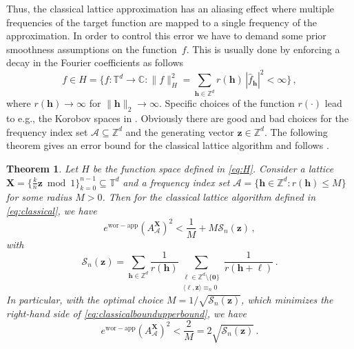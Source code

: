 \documentclass[a4paper]{amsart}
\newtheorem{theorem}{Theorem}[section]
\renewcommand{\hat}{\widehat}
\newcommand{\ewc}{e^{\mathrm{wor-app}}}
\newcommand{\modone}{\bmod{}1}
\begin{document}
Thus, the classical lattice approximation has an aliasing effect where multiple frequencies of the target function are mapped to a single frequency of the approximation.
In order to control this error we have to demand some prior smoothness assumptions on the function~$f$.
This is usually done by enforcing a decay in the Fourier coefficients as follows
\begin{equation}\label{eq:H}
    f\in H
    = \Big\{ f\colon\mathds T^d \to\mathds C : 
    \|f\|_H^2
    = \sum_{\bm h\in\mathds Z^d} r(\bm h) \, |\hat f_{\bm h}|^2
    < \infty \Big\} \,,
\end{equation}
where $r(\bm h)\to\infty$ for $\|\bm h\|_2 \to \infty$.
Specific choices of the function $r(\cdot)$ lead to e.g., the Korobov spaces in .
Obviously there are good and bad choices for the frequency index set $\mathcal A\subseteq\mathds Z^d$ and the generating vector $\bm z\in\mathds Z^d$.
The following theorem gives an error bound for the classical lattice algorithm and follows \cite[Section~2.4]{CKNS20}.

\begin{theorem}\label{classicalbound} Let $H$ be the function space defined in \eqref{eq:H}.
    Consider a lattice $\bm X = \{\tfrac kn\bm z\modone\}_{k=0}^{n-1} \subseteq\mathds T^d$ and a frequency index set
    $ \mathcal A = \{ \bm h\in\mathds Z^d : r(\bm h) \le M \} $ 
    for some radius $M>0$.
    Then for the classical lattice algorithm defined in \eqref{eq:classical}, we have
    \begin{equation}\label{eq:classicalboundupperbound}
        \ewc(A_{\mathcal A}^{\bm X})^2
        < \frac 1M + M \mathcal S_n(\bm z) \,,
    \end{equation}
    with
    \begin{equation}\label{eq:S}
        \mathcal S_n(\bm z)
        = \sum_{\bm h\in\mathds Z^d} \frac{1}{r(\bm h)} \sum_{\substack{\bm\ell\in\mathds Z^d\setminus\{\bm 0\}\\\langle\bm\ell,\bm z\rangle\equiv_n 0}} \frac{1}{r(\bm h+\bm\ell)} \,.
    \end{equation}
    In particular, with the optimal choice $M = 1/\sqrt{\mathcal S_n(\bm z)}$, which minimizes the right-hand side of \eqref{eq:classicalboundupperbound}, we have
    \begin{equation}\label{eq:classicalbound}
        \ewc(A_{\mathcal A}^{\bm X})^2
        <\frac 2M
        = 2 \sqrt{\mathcal S_n(\bm z)} \,.
    \end{equation}
\end{theorem} 
\end{document}
